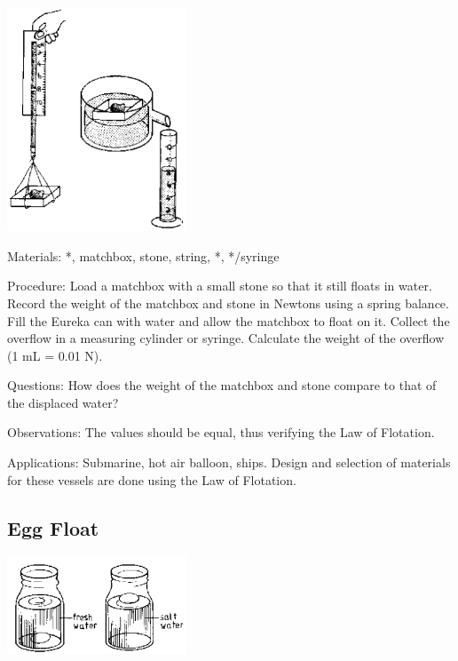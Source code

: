 \begin{multicols}{2}
\begin{center}
\includegraphics[width=0.4\textwidth]{./img/source/flotation.png}
\end{center}

\begin{description*}
\item[Materials:]{*, matchbox, stone, string, *, */syringe}
\item[Procedure:]{Load a matchbox with a small stone so that it still floats in water. Record the weight of the matchbox and stone in Newtons using a spring balance. Fill the Eureka can with water and allow the matchbox to float on it. Collect the overflow in a measuring cylinder or syringe. Calculate the weight of the overflow (1 mL = 0.01 N).}
\item[Questions:]{How does the weight of the matchbox and stone compare to that of the displaced water?}
\item[Observations:]{The values should be equal, thus verifying the Law of Flotation.}
\item[Applications:]{Submarine, hot air balloon, ships. Design and selection of materials for these vessels are done using the Law of Flotation.}
\end{description*}

\subsection{Egg Float}

\begin{center}
\includegraphics[width=0.4\textwidth]{./img/source/egg-float.png}
\end{center}


\end{multicols}
